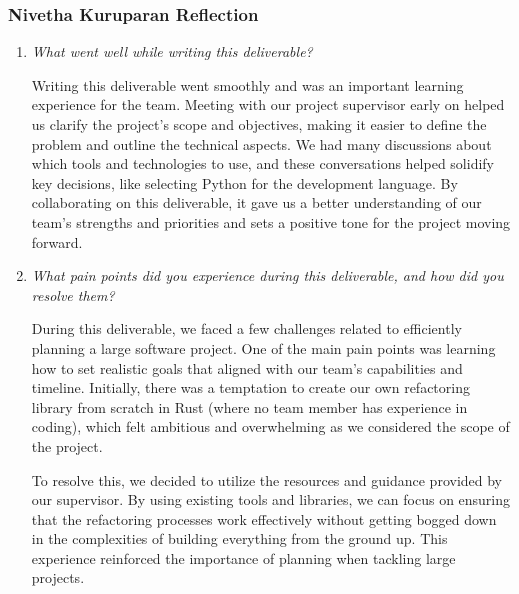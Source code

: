 \documentclass{article}
\begin{document}
\subsubsection*{Nivetha Kuruparan Reflection}
\begin{enumerate}
  \item \textit{What went well while writing this deliverable?}

    Writing this deliverable went smoothly and was an important
    learning experience for the team.
    Meeting with our project supervisor early on helped us clarify
    the project’s scope and objectives,
    making it easier to define the problem and outline the technical
    aspects. We had many discussions
    about which tools and technologies to use, and these
    conversations helped solidify key decisions,
    like selecting Python for the development language. By
    collaborating on this deliverable, it gave
    us a better understanding of our team's strengths and priorities
    and sets a positive tone for the
    project moving forward.

  \item \textit{What pain points did you experience during this
    deliverable, and how did you resolve them?}

    During this deliverable, we faced a few challenges related to
    efficiently planning a large software
    project. One of the main pain points was learning how to set
    realistic goals that aligned with our
    team's capabilities and timeline. Initially, there was a
    temptation to create our own refactoring
    library from scratch in Rust (where no team member has experience
    in coding), which felt ambitious
    and overwhelming as we considered the scope of the project.

    To resolve this, we decided to utilize the resources and guidance
    provided by our supervisor. By using
    existing tools and libraries, we can focus on ensuring that the
    refactoring processes work effectively
    without getting bogged down in the complexities of building
    everything from the ground up. This
    experience reinforced the importance of planning when tackling
    large projects.

\end{enumerate}
\end{document}
